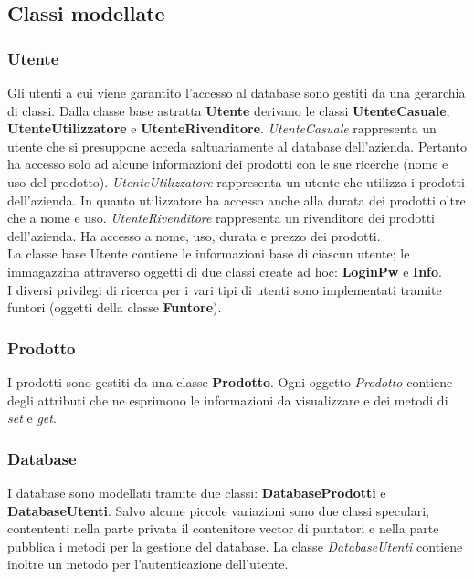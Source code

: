 \documentclass[a4paper,10pt] {article}
\begin{document}
\subsection{Classi modellate}
\subsubsection{Utente}
Gli utenti a cui viene garantito l'accesso al database sono gestiti da una 
gerarchia di classi. Dalla classe base astratta \textbf{Utente} derivano le 
classi 
\textbf{UtenteCasuale}, \textbf{UtenteUtilizzatore} e 
\textbf{UtenteRivenditore}. \textsl{UtenteCasuale} rappresenta un utente che si 
presuppone acceda saltuariamente al
database dell'azienda. Pertanto ha accesso solo ad alcune informazioni dei 
prodotti con le sue ricerche (nome e uso del prodotto). 
\textsl{UtenteUtilizzatore} rappresenta
un utente che utilizza i prodotti dell'azienda. In quanto utilizzatore ha 
accesso anche alla durata dei prodotti oltre che a nome e uso. 
\textsl{UtenteRivenditore}
rappresenta un rivenditore dei prodotti dell'azienda. Ha accesso a nome, uso, 
durata e prezzo dei prodotti.\\
La classe base Utente contiene le informazioni base di ciascun utente; le 
immagazzina attraverso oggetti di due classi create ad hoc: \textbf{LoginPw} e 
\textbf{Info}.\\
I diversi privilegi di ricerca per i vari tipi di utenti sono implementati 
tramite funtori (oggetti della classe \textbf{Funtore}).

\subsubsection{Prodotto}
I prodotti sono gestiti da una classe \textbf{Prodotto}. Ogni oggetto 
\textsl{Prodotto} contiene degli attributi che ne esprimono le informazioni da 
visualizzare e dei metodi di \textsl{set} e \textsl{get}.

\subsubsection{Database}
I database sono modellati tramite due classi: \textbf{DatabaseProdotti} e 
\textbf{DatabaseUtenti}. Salvo alcune piccole variazioni sono due classi 
speculari, contententi nella
parte privata il contenitore vector di puntatori e nella parte pubblica i 
metodi 
per la gestione del database. La classe \textsl{DatabaseUtenti} contiene 
inoltre 
un metodo
per l'autenticazione dell'utente.
\end{document}
